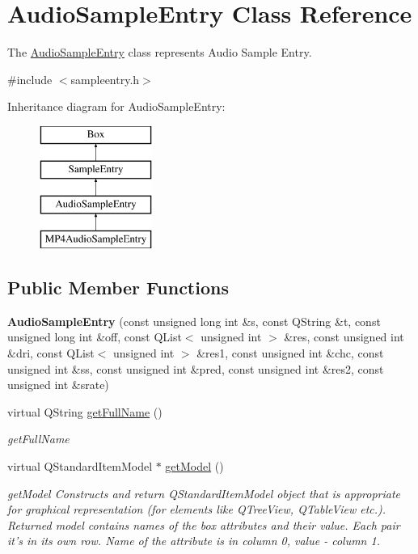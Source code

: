 \hypertarget{class_audio_sample_entry}{\section{Audio\-Sample\-Entry Class Reference}
\label{class_audio_sample_entry}
}


The \hyperlink{class_audio_sample_entry}{Audio\-Sample\-Entry} class represents Audio Sample Entry.  




{\ttfamily \#include $<$sampleentry.\-h$>$}

Inheritance diagram for Audio\-Sample\-Entry\-:\begin{figure}[H]
\begin{center}
\leavevmode
\includegraphics[height=4.000000cm]{class_audio_sample_entry}
\end{center}
\end{figure}
\subsection*{Public Member Functions}
\begin{DoxyCompactItemize}
\item 
\hypertarget{class_audio_sample_entry_a116cc7ac9bc082585d50850482944e07}{{\bfseries Audio\-Sample\-Entry} (const unsigned long int \&s, const Q\-String \&t, const unsigned long int \&off, const Q\-List$<$ unsigned int $>$ \&res, const unsigned int \&dri, const Q\-List$<$ unsigned int $>$ \&res1, const unsigned int \&chc, const unsigned int \&ss, const unsigned int \&pred, const unsigned int \&res2, const unsigned int \&srate)}\label{class_audio_sample_entry_a116cc7ac9bc082585d50850482944e07}

\item 
virtual Q\-String \hyperlink{class_audio_sample_entry_a928ab5498c0a8679ed624f9089dc5825}{get\-Full\-Name} ()
\begin{DoxyCompactList}\small\item\em get\-Full\-Name \end{DoxyCompactList}\item 
virtual Q\-Standard\-Item\-Model $\ast$ \hyperlink{class_audio_sample_entry_a8666027778c6cf9438d4af902c1793ab}{get\-Model} ()
\begin{DoxyCompactList}\small\item\em get\-Model Constructs and return Q\-Standard\-Item\-Model object that is appropriate for graphical representation (for elements like Q\-Tree\-View, Q\-Table\-View etc.). Returned model contains names of the box attributes and their value. Each pair it's in its own row. Name of the attribute is in column 0, value -\/ column 1. \end{DoxyCompactList}\end{DoxyCompactItemize}
